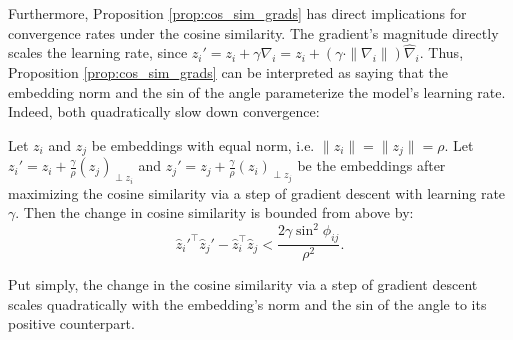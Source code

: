 Furthermore, Proposition \ref{prop:cos_sim_grads} has direct implications for convergence rates under the cosine similarity. The gradient's magnitude directly scales the learning rate, since $z_i' = z_i + \gamma \nabla_i = z_i + \left( \gamma \cdot \| \nabla_i \| \right) \hat{\nabla}_i.$ Thus, Proposition \ref{prop:cos_sim_grads} can be interpreted as saying that the embedding norm and the sin of the angle parameterize the model's learning rate. Indeed, both quadratically slow down convergence:

\begin{theorem}
\label{thm:convergence_rate}
    Let $z_i$ and $z_j$ be embeddings with equal norm, i.e. $\|z_i\| = \|z_j\| = \rho$. Let $z_i' = z_i + \frac{\gamma}{\rho}(z_j)_{\perp z_i}$ and $z_j' = z_j
    + \frac{\gamma}{\rho}(z_i)_{\perp z_j}$ be the embeddings after maximizing the cosine similarity via a step of gradient descent with learning rate $\gamma$.
    Then the change in cosine similarity is bounded from above by:
        \begin{equation}
            \label{eq:thm_statement}
            \hat{z}_i'^\top \hat{z}_j' - \hat{z}_i^\top \hat{z}_j < \frac{2 \gamma \sin^2 \phi_{ij}}{\rho^2}.
        \end{equation}
\end{theorem}
Put simply, the change in the cosine similarity via a step of gradient descent scales quadratically with the embedding's norm and the sin of the angle to its positive counterpart.